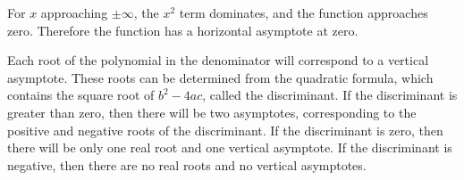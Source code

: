 For $x$ approaching $\pm\infty$, the $x^2$ term dominates, and
the function approaches zero. Therefore the function
has a horizontal asymptote at zero.

Each root of the polynomial in the denominator will correspond to
a vertical asymptote. These roots can be determined from the
quadratic formula, which contains the square root of $b^2-4ac$,
called the discriminant. If the discriminant is greater than zero,
then there will be two asymptotes, corresponding to the positive
and negative roots of the discriminant. If the discriminant is
zero, then there will be only one real root and one vertical
asymptote. If the discriminant is negative, then there are no
real roots and no vertical asymptotes.
